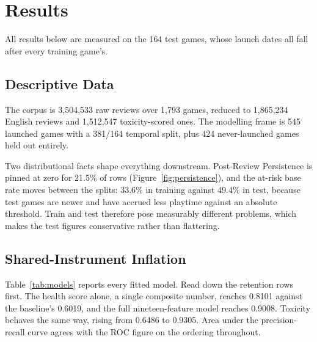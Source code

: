 \documentclass[sigconf]{acmart}
\begin{document}
\section{Results}
\label{sec:results}

All results below are measured on the 164 test games, whose launch dates all fall after every
training game's.

\subsection{Descriptive Data}
\label{sec:resDescriptive}

The corpus is 3,504,533 raw reviews over 1,793 games, reduced to 1,865,234 English reviews and
1,512,547 toxicity-scored ones. The modelling frame is 545 launched games with a 381/164 temporal
split, plus 424 never-launched games held out entirely.

Two distributional facts shape everything downstream. Post-Review Persistence is pinned at zero for
21.5\% of rows (Figure~\ref{fig:persistence}), and the at-risk base rate moves between the splits:
33.6\% in training against 49.4\% in test, because test games are newer and have accrued less
playtime against an absolute threshold. Train and test therefore pose measurably different
problems, which makes the test figures conservative rather than flattering.

\subsection{Shared-Instrument Inflation}
\label{sec:resLeakage}

Table~\ref{tab:models} reports every fitted model. Read down the retention rows first. The health
score alone, a single composite number, reaches 0.8101 against the baseline's 0.6019, and the full
nineteen-feature model reaches 0.9008. Toxicity behaves the same way, rising from 0.6486 to 0.9305.
Area under the precision-recall curve agrees with the ROC figure on the ordering throughout.
\end{document}
